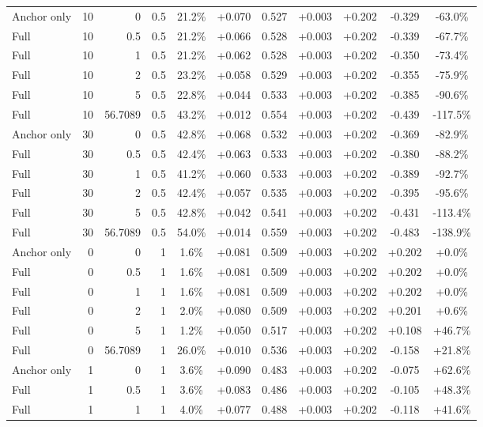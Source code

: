 \begin{table}[htbp]
\begin{tabular}{lrrrccccccc}
Anchor only & 10 & 0 & 0.5 & 21.2\% & +0.070 & 0.527 & +0.003 & +0.202 & -0.329 & -63.0\% \\
Full & 10 & 0.5 & 0.5 & 21.2\% & +0.066 & 0.528 & +0.003 & +0.202 & -0.339 & -67.7\% \\
Full & 10 & 1 & 0.5 & 21.2\% & +0.062 & 0.528 & +0.003 & +0.202 & -0.350 & -73.4\% \\
Full & 10 & 2 & 0.5 & 23.2\% & +0.058 & 0.529 & +0.003 & +0.202 & -0.355 & -75.9\% \\
Full & 10 & 5 & 0.5 & 22.8\% & +0.044 & 0.533 & +0.003 & +0.202 & -0.385 & -90.6\% \\
Full & 10 & 56.7089 & 0.5 & 43.2\% & +0.012 & 0.554 & +0.003 & +0.202 & -0.439 & -117.5\% \\
Anchor only & 30 & 0 & 0.5 & 42.8\% & +0.068 & 0.532 & +0.003 & +0.202 & -0.369 & -82.9\% \\
Full & 30 & 0.5 & 0.5 & 42.4\% & +0.063 & 0.533 & +0.003 & +0.202 & -0.380 & -88.2\% \\
Full & 30 & 1 & 0.5 & 41.2\% & +0.060 & 0.533 & +0.003 & +0.202 & -0.389 & -92.7\% \\
Full & 30 & 2 & 0.5 & 42.4\% & +0.057 & 0.535 & +0.003 & +0.202 & -0.395 & -95.6\% \\
Full & 30 & 5 & 0.5 & 42.8\% & +0.042 & 0.541 & +0.003 & +0.202 & -0.431 & -113.4\% \\
Full & 30 & 56.7089 & 0.5 & 54.0\% & +0.014 & 0.559 & +0.003 & +0.202 & -0.483 & -138.9\% \\
Anchor only & 0 & 0 & 1 & 1.6\% & +0.081 & 0.509 & +0.003 & +0.202 & +0.202 & +0.0\% \\
Full & 0 & 0.5 & 1 & 1.6\% & +0.081 & 0.509 & +0.003 & +0.202 & +0.202 & +0.0\% \\
Full & 0 & 1 & 1 & 1.6\% & +0.081 & 0.509 & +0.003 & +0.202 & +0.202 & +0.0\% \\
Full & 0 & 2 & 1 & 2.0\% & +0.080 & 0.509 & +0.003 & +0.202 & +0.201 & +0.6\% \\
Full & 0 & 5 & 1 & 1.2\% & +0.050 & 0.517 & +0.003 & +0.202 & +0.108 & +46.7\% \\
Full & 0 & 56.7089 & 1 & 26.0\% & +0.010 & 0.536 & +0.003 & +0.202 & -0.158 & +21.8\% \\
Anchor only & 1 & 0 & 1 & 3.6\% & +0.090 & 0.483 & +0.003 & +0.202 & -0.075 & +62.6\% \\
Full & 1 & 0.5 & 1 & 3.6\% & +0.083 & 0.486 & +0.003 & +0.202 & -0.105 & +48.3\% \\
Full & 1 & 1 & 1 & 4.0\% & +0.077 & 0.488 & +0.003 & +0.202 & -0.118 & +41.6\% \\

\end{tabular}
\end{table}
